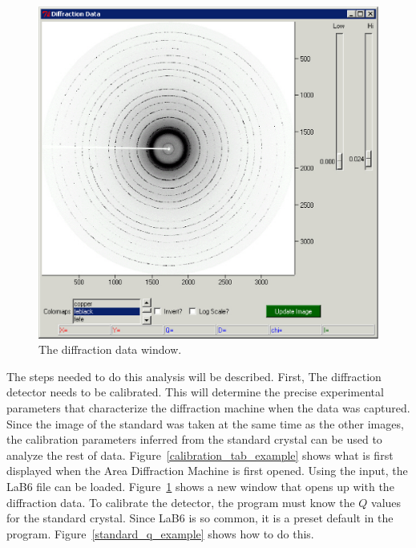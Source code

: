\begin{figure}
    \centering
    \includegraphics[scale=.75]
    {figures/diffraction_data_window_example.eps}
    \caption{The diffraction data window.}
    \label{diffraction_data_window_example}
\end{figure}

The steps needed to do this analysis will be
described. First, The diffraction detector needs to be calibrated.
This will determine the precise experimental parameters that 
characterize the diffraction machine when the data was captured.
Since the image of the standard was taken at the same
time as the other images, the calibration parameters inferred
from the standard crystal can be used to analyze the rest of data.
Figure~\ref{calibration_tab_example} shows what 
is first displayed when the Area Diffraction Machine is first
opened. Using the  input, the LaB6
file can be loaded. 
Figure~\ref{diffraction_data_window_example} shows a new
window that opens up with the diffraction data.
To calibrate the detector, the program must know the 
$Q$ values for the standard crystal. Since LaB6 is so common, it is
a preset default in the program. Figure~\ref{standard_q_example}
shows how to do this.

